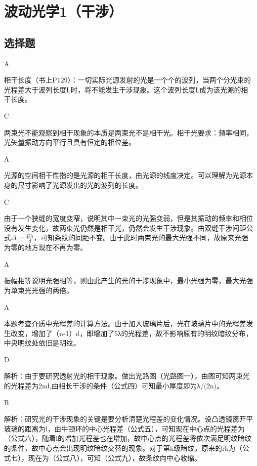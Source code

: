 \chapter{波动光学1（干涉）}
\makeatletter
{}
\makeatother
\section{选择题}
\exercise A

\solve 相干长度（书上P129）：一切实际光源发射的光是一个个的波列，当两个分光束的光程差大于波列长度L时，将不能发生干涉现象。这个波列长度L成为该光源的相干长度。 

\exercise C

\solve 两束光不能观察到相干现象的本质是两束光不是相干光。相干光要求：频率相同，光矢量振动方向平行且具有恒定的相位差。

\exercise A

\solve 光源的空间相干性指的是光源的相干长度，由光源的线度决定。可以理解为光源本身的尺寸影响了光源发出的光的波列的长度。

\exercise C

\solve 由于一个狭缝的宽度变窄，说明其中一束光的光强变弱，但是其振动的频率和相位没有发生变化，故两束光仍然是相干光，仍然会发生干涉现象。由双缝干涉间距公式$\Delta=\frac{D\lambda}{d}$，可知条纹的间距不变。由于此时两束光的最大光强不同，故原来光强为零的地方现在不再为零。

\exercise A

\solve 振幅相等说明光强相等，则由此产生的光的干涉现象中，最小光强为零，最大光强为单束光光强的两倍。

\exercise A

\solve 本题考查介质中光程差的计算方法。由于加入玻璃片后，光在玻璃片中的光程差发生改变，增加了（n-1）d，即增加了5λ的光程差，故不影响原有的明纹暗纹分布，中央明纹处依旧是明纹。

\exercise D

\solve 解析：由于要研究透射光的相干现象。做出光路图（光路图一），由图可知两束光的光程差为2nd,由相长干涉的条件（公式四）可知最小厚度即为λ/(2n)。

\exercise B

\solve 解析：研究光的干涉现象的关键是要分析清楚光程差的变化情况。设凸透镜离开平玻璃的距离为l，由牛顿环的中心光程差（公式五），可知现在中心点的光程差为（公式六），随着l的增加光程差也在增加，故中心点的光程差将依次满足明纹暗纹的条件，故中心点会出现明纹暗纹交替的现象。对于第k级暗纹，原来的rk为（公式七），现在为（公式八），可知（公式九），故条纹向中心收缩。

